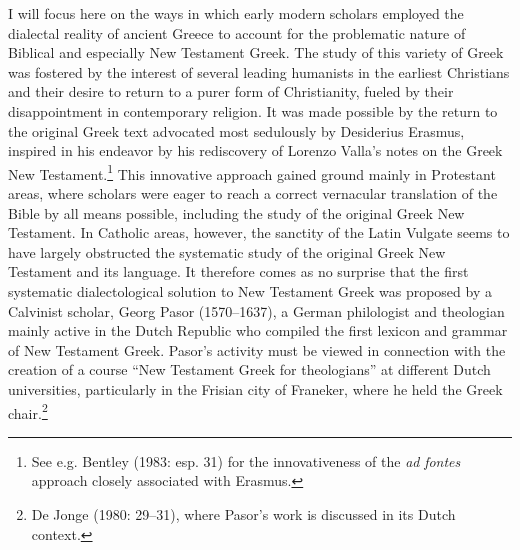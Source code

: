 \documentclass[output=paper]{langsci/langscibook}
\begin{document}
I will focus here on the ways in which early modern scholars employed the dialectal reality of ancient Greece to account for the problematic nature of Biblical and especially New Testament Greek. The study of this variety of Greek was fostered by the interest of several leading humanists in the earliest Christians and their desire to return to a purer form of Christianity, fueled by their disappointment in contemporary religion. It was made possible by the return to the original Greek text advocated most sedulously by Desiderius Erasmus, inspired in his endeavor by his rediscovery of Lorenzo Valla’s notes on the Greek New Testament.\footnote{See e.g. Bentley (1983: esp. 31) for the innovativeness of the \textit{ad} \textit{fontes} approach closely associated with Erasmus.} This innovative approach gained ground mainly in Protestant areas, where scholars were eager to reach a correct vernacular translation of the Bible by all means possible, including the study of the original Greek New Testament. In Catholic areas, however, the sanctity of the Latin Vulgate seems to have largely obstructed the systematic study of the original Greek New Testament and its language. It therefore comes as no surprise that the first systematic dialectological solution to New Testament Greek was proposed by a Calvinist scholar, Georg Pasor (1570–1637), a German philologist and theologian mainly active in the Dutch Republic who compiled the first lexicon and grammar of New Testament Greek. Pasor’s activity must be viewed in connection with the creation of a course “New Testament Greek for theologians” at different Dutch universities, particularly in the Frisian city of Franeker, where he held the Greek chair.\footnote{De Jonge (1980: 29–31), where Pasor’s work is discussed in its Dutch context.}
\end{document}
